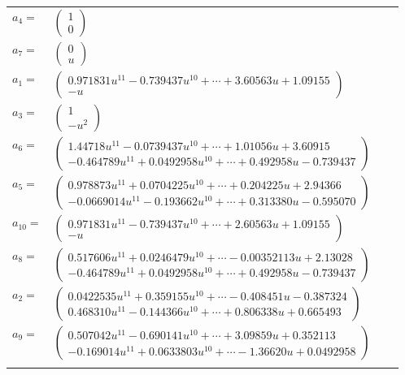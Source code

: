 \documentclass[1p]{elsarticle_modified}
\theoremstyle{definition}
\begin{document}
\begin{tabular}{m{7pt} m{180pt} m{7pt} m{180pt} }
\flushright $a_{4}=$&$\begin{pmatrix}1\\0\end{pmatrix}$ \\
\flushright $a_{7}=$&$\begin{pmatrix}0\\u\end{pmatrix}$ \\
\flushright $a_{1}=$&$\begin{pmatrix}0.971831 u^{11}-0.739437 u^{10}+\cdots+3.60563 u+1.09155\\- u\end{pmatrix}$ \\
\flushright $a_{3}=$&$\begin{pmatrix}1\\- u^2\end{pmatrix}$ \\
\flushright $a_{6}=$&$\begin{pmatrix}1.44718 u^{11}-0.0739437 u^{10}+\cdots+1.01056 u+3.60915\\-0.464789 u^{11}+0.0492958 u^{10}+\cdots+0.492958 u-0.739437\end{pmatrix}$ \\
\flushright $a_{5}=$&$\begin{pmatrix}0.978873 u^{11}+0.0704225 u^{10}+\cdots+0.204225 u+2.94366\\-0.0669014 u^{11}-0.193662 u^{10}+\cdots+0.313380 u-0.595070\end{pmatrix}$ \\
\flushright $a_{10}=$&$\begin{pmatrix}0.971831 u^{11}-0.739437 u^{10}+\cdots+2.60563 u+1.09155\\- u\end{pmatrix}$ \\
\flushright $a_{8}=$&$\begin{pmatrix}0.517606 u^{11}+0.0246479 u^{10}+\cdots-0.00352113 u+2.13028\\-0.464789 u^{11}+0.0492958 u^{10}+\cdots+0.492958 u-0.739437\end{pmatrix}$ \\
\flushright $a_{2}=$&$\begin{pmatrix}0.0422535 u^{11}+0.359155 u^{10}+\cdots-0.408451 u-0.387324\\0.468310 u^{11}-0.144366 u^{10}+\cdots+0.806338 u+0.665493\end{pmatrix}$ \\
\flushright $a_{9}=$&$\begin{pmatrix}0.507042 u^{11}-0.690141 u^{10}+\cdots+3.09859 u+0.352113\\-0.169014 u^{11}+0.0633803 u^{10}+\cdots-1.36620 u+0.0492958\end{pmatrix}$\\&\end{tabular}
\end{document}
